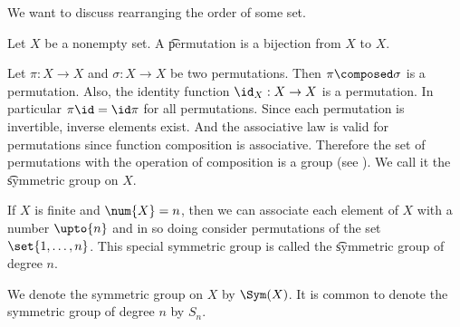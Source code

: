 

We want to discuss rearranging the order of some set.


Let $X$ be a nonempty set.
A \t{permutation} is a bijection from $X$ to $X$.

Let $\pi: X \to X$ and $\sigma: X \to X$ be two permutations.
Then $\pi \composed \sigma$ is a permutation.
Also, the identity function $\id_{X}: X \to X$ is a permutation.
In particular $\pi\id = \id\pi$ for all permutations.
Since each permutation is invertible, inverse elements exist.
And the associative law is valid for permutations since function composition is associative.
Therefore the set of permutations with the operation of composition is a group (see ).
We call it the \t{symmetric group on $X$}.

If $X$ is finite and $\num{X} = n$, then we can associate each element of $X$ with a number $\upto{n}$ and in so doing consider permutations of the set $\set{1, \dots, n}$.
This special symmetric group is called the \t{symmetric group of degree $n$}.


We denote the symmetric group on $X$ by $\Sym(X)$.
It is common to denote the symmetric group of degree $n$ by $S_n$.

\blankpage
